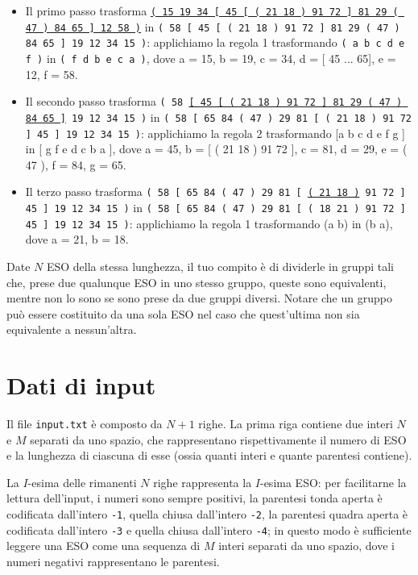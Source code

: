 \documentclass[a4paper,11pt]{article}
\begin{document}
\begin{itemize}
  \item Il primo passo trasforma \underline{\texttt{( 15 19 34 [ 45 [ ( 21 18 ) 91 72 ] 81 29 ( 47 ) 84 65 ] 12 58 )}}
    in \texttt{( 58 [ 45 [ ( 21 18 ) 91 72 ] 81 29 ( 47 ) 84 65 ] 19 12 34 15 )}:
    applichiamo la regola 1 trasformando \texttt{( a b c d e f )} in \texttt{( f d b e c a )},
    dove a = 15, b = 19, c = 34, d = [ 45 ... 65], e = 12, f = 58.
  \item Il secondo passo trasforma
    \texttt{( 58 \underline{[ 45 [ ( 21 18 ) 91 72 ] 81 29 ( 47 ) 84 65 ]} 19 12 34 15 )}
    in \texttt{( 58 [ 65 84 ( 47 ) 29 81 [ ( 21 18 ) 91 72 ] 45 ] 19 12 34 15 )}:
    applichiamo la regola 2 trasformando [a b c d e f g ] in [ g f e d c b a ],
    dove a = 45, b = [ ( 21 18 ) 91 72 ], c = 81, d = 29, e = ( 47 ), f = 84, g = 65.
  \item Il terzo passo trasforma \texttt{( 58 [ 65 84 ( 47 ) 29 81 [ \underline{( 21 18 )} 91 72 ] 45 ] 19 12 34 15 )}
    in \texttt{( 58 [ 65 84 ( 47 ) 29 81 [ ( 18 21 ) 91 72 ] 45 ] 19 12 34 15 )}:
    applichiamo la regola 1 trasformando (a b) in (b a), dove a = 21, b = 18.
\end{itemize}

Date $N$ ESO della stessa lunghezza, il tuo compito è di
dividerle in gruppi tali che, prese due qualunque ESO in uno
stesso gruppo, queste sono equivalenti, mentre non lo sono se sono
prese da due gruppi diversi. Notare che un gruppo può essere
costituito da una sola ESO nel caso che quest'ultima non sia
equivalente a nessun'altra.

\section*{Dati di input}

Il file \texttt{input.txt} è composto da $N+1$
righe. La prima riga contiene due interi $N$ e $M$
separati da uno spazio, che rappresentano rispettivamente il numero di
ESO e la lunghezza di ciascuna di esse (ossia quanti interi e
quante parentesi contiene). 

La $I$-esima delle rimanenti $N$ righe rappresenta
la $I$-esima ESO: per facilitarne la lettura dell'input, i
numeri sono sempre positivi, la parentesi tonda aperta è codificata
dall'intero \texttt{-1}, quella chiusa dall'intero \texttt{-2}, la
parentesi quadra aperta è codificata dall'intero \texttt{-3} e quella
chiusa dall'intero \texttt{-4}; in questo modo è sufficiente leggere una
ESO come una sequenza di $M$ interi separati da uno spazio, dove i numeri
negativi rappresentano le parentesi.
\end{document}
